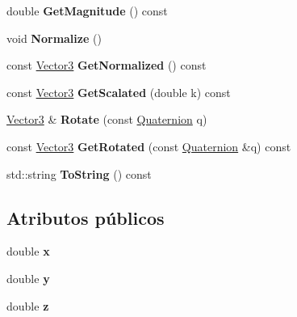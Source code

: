 \begin{DoxyCompactItemize}
\item 
\hypertarget{classdfv_1_1Vector3_a03eabf1d7ef83f469ceb29986f799813}{double {\bfseries \-Get\-Magnitude} () const }\label{classdfv_1_1Vector3_a03eabf1d7ef83f469ceb29986f799813}

\item 
\hypertarget{classdfv_1_1Vector3_a36a2ba3a2612ff37390cdd188c61b560}{void {\bfseries \-Normalize} ()}\label{classdfv_1_1Vector3_a36a2ba3a2612ff37390cdd188c61b560}

\item 
\hypertarget{classdfv_1_1Vector3_afddb9cad4ad1d851f3b47547e49f1132}{const \hyperlink{classdfv_1_1Vector3}{\-Vector3} {\bfseries \-Get\-Normalized} () const }\label{classdfv_1_1Vector3_afddb9cad4ad1d851f3b47547e49f1132}

\item 
\hypertarget{classdfv_1_1Vector3_aa59d01979f5045a6098ed0122a416501}{const \hyperlink{classdfv_1_1Vector3}{\-Vector3} {\bfseries \-Get\-Scalated} (double k) const }\label{classdfv_1_1Vector3_aa59d01979f5045a6098ed0122a416501}

\item 
\hypertarget{classdfv_1_1Vector3_ae4ac5429848499a093d9bf8ffb4f9418}{\hyperlink{classdfv_1_1Vector3}{\-Vector3} \& {\bfseries \-Rotate} (const \hyperlink{classdfv_1_1Quaternion}{\-Quaternion} q)}\label{classdfv_1_1Vector3_ae4ac5429848499a093d9bf8ffb4f9418}

\item 
\hypertarget{classdfv_1_1Vector3_aabbddebc67c3ba692ed3b452e9d72614}{const \hyperlink{classdfv_1_1Vector3}{\-Vector3} {\bfseries \-Get\-Rotated} (const \hyperlink{classdfv_1_1Quaternion}{\-Quaternion} \&q) const }\label{classdfv_1_1Vector3_aabbddebc67c3ba692ed3b452e9d72614}

\item 
\hypertarget{classdfv_1_1Vector3_ad8216bd8a5ccef1b4843baa5316eceec}{std\-::string {\bfseries \-To\-String} () const }\label{classdfv_1_1Vector3_ad8216bd8a5ccef1b4843baa5316eceec}

\end{DoxyCompactItemize}
\subsection*{\-Atributos públicos}
\begin{DoxyCompactItemize}
\item 
\hypertarget{classdfv_1_1Vector3_a1bd8a905e9b1ab71301a2c843f1b1d5b}{double {\bfseries x}}\label{classdfv_1_1Vector3_a1bd8a905e9b1ab71301a2c843f1b1d5b}

\item 
\hypertarget{classdfv_1_1Vector3_a5903b21a2b7654210e58f852fe986b4d}{double {\bfseries y}}\label{classdfv_1_1Vector3_a5903b21a2b7654210e58f852fe986b4d}

\item 
\hypertarget{classdfv_1_1Vector3_ad016d0d6a46ba768a594db156f8215cb}{double {\bfseries z}}\label{classdfv_1_1Vector3_ad016d0d6a46ba768a594db156f8215cb}

\end{DoxyCompactItemize}
